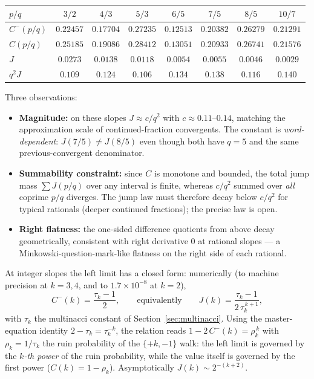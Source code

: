 \documentclass[11pt]{article}
\theoremstyle{definition}
\theoremstyle{remark}
\begin{document}
\smallskip
\begin{center}
\begin{tabular}{lccccccc}
\toprule
$p/q$ & $3/2$ & $4/3$ & $5/3$ & $6/5$ & $7/5$ & $8/5$ & $10/7$ \\
\midrule
$C^-(p/q)$ & $0.22457$ & $0.17704$ & $0.27235$ & $0.12513$ & $0.20382$ & $0.26279$ & $0.21291$ \\
$C(p/q)$   & $0.25185$ & $0.19086$ & $0.28412$ & $0.13051$ & $0.20933$ & $0.26741$ & $0.21576$ \\
$J$        & $0.0273$  & $0.0138$  & $0.0118$  & $0.0054$  & $0.0055$  & $0.0046$  & $0.0029$ \\
$q^2 J$    & $0.109$   & $0.124$   & $0.106$   & $0.134$   & $0.138$   & $0.116$   & $0.140$ \\
\bottomrule
\end{tabular}
\end{center}

\smallskip
Three observations:
\begin{itemize}
\item \textbf{Magnitude:} on these slopes $J \approx c/q^2$ with
  $c \approx 0.11$--$0.14$, matching the approximation scale of
  continued-fraction convergents.
  The constant is \emph{word-dependent}: $J(7/5) \neq J(8/5)$ even
  though both have $q = 5$ and the same previous-convergent
  denominator.
\item \textbf{Summability constraint:} since $C$ is monotone and
  bounded, the total jump mass $\sum J(p/q)$ over any interval is
  finite, whereas $c/q^2$ summed over \emph{all} coprime $p/q$
  diverges.
  The jump law must therefore decay below $c/q^2$ for typical
  rationals (deeper continued fractions); the precise law is open.
\item \textbf{Right flatness:} the one-sided difference quotients
  from above decay geometrically, consistent with right derivative
  $0$ at rational slopes --- a Minkowski-question-mark-like flatness
  on the right side of each rational.
\end{itemize}

At integer slopes the left limit has a closed form: numerically (to
machine precision at $k = 3, 4$, and to $1.7 \times 10^{-8}$ at
$k = 2$),
\[
C^-(k) = \frac{\tau_k - 1}{2},
\qquad\text{equivalently}\qquad
J(k) = \frac{\tau_k - 1}{2\,\tau_k^{\,k+1}},
\]
with $\tau_k$ the multinacci constant of
Section~\ref{sec:multinacci}.
Using the master-equation identity $2 - \tau_k = \tau_k^{-k}$, the
relation reads $1 - 2\,C^-(k) = \rho_k^{\,k}$ with
$\rho_k = 1/\tau_k$ the ruin probability of the $\{+k, -1\}$ walk:
the left limit is governed by the \emph{$k$-th power} of the ruin
probability, while the value itself is governed by the first power
($C(k) = 1 - \rho_k$).
Asymptotically $J(k) \sim 2^{-(k+2)}$.
\end{document}
